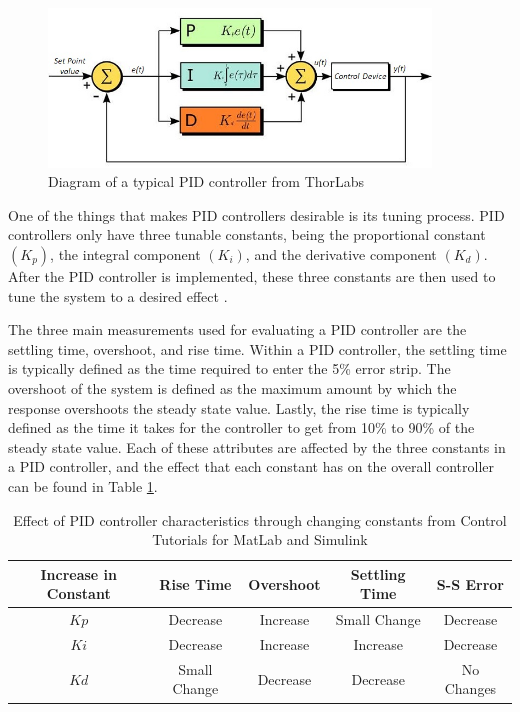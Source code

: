 \documentclass[titlepage,draft]{article}
\begin{document}
{\begin{figure}
	\centering
	\includegraphics[width=4in]{PID2.jpg}
	\caption{Diagram of a typical PID controller from ThorLabs \cite{PIDDiagram}}
	\label{fig:piddiagram}
\end{figure}

One of the things that makes PID controllers desirable is its tuning process. PID controllers only have three tunable constants, being the proportional constant \((K_p)\), the integral component \((K_i)\), and the derivative component \((K_d)\). After the PID controller is implemented, these three constants are then used to tune the system to a desired effect \cite{pid_advantages}.

The three main measurements used for evaluating a PID controller are the settling time, overshoot, and rise time. Within a PID controller, the settling time is typically defined as the time required to enter the 5\% error strip. The overshoot of the system is defined as the maximum amount by which the response overshoots the steady state value. Lastly, the rise time is typically defined as the time it takes for the controller to get from 10\% to 90\% of the steady state value. Each of these attributes are affected by the three constants in a PID controller, and the effect that each constant has on the overall controller can be found in Table \ref{tab:pidvals}.

\begin{table}[H]
	\centering
	\caption{Effect of PID controller characteristics through changing constants from Control Tutorials for MatLab and Simulink \cite{pid_characteristics}}
	\begin{tabular}{|c | c | c | c | c |}
		\hline
		Increase in Constant & Rise Time    & Overshoot & Settling Time & S-S Error  \\ [0.5ex]
		\hline
		\(Kp\)               & Decrease     & Increase  & Small Change  & Decrease   \\
		\hline
		\(Ki\)               & Decrease     & Increase  & Increase      & Decrease   \\
		\hline
		\(Kd\)               & Small Change & Decrease  & Decrease      & No Changes \\
		\hline
	\end{tabular}
	\label{tab:pidvals}
\end{table}

}
\end{document}
